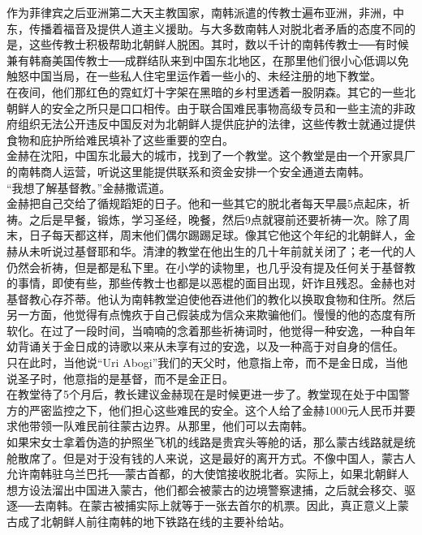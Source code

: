 作为菲律宾之后亚洲第二大天主教国家，南韩派遣的传教士遍布亚洲，非洲，中东，传播着福音及提供人道主义援助。与大多数南韩人对脱北者矛盾的态度不同的是，这些传教士积极帮助北朝鲜人脱困。其时，数以千计的南韩传教士──有时候兼有韩裔美国传教士──成群结队来到中国东北地区，在那里他们很小心低调以免触怒中国当局，在一些私人住宅里运作着一些小的、未经注册的地下教堂。\\

在夜间，他们那红色的霓虹灯十字架在黑暗的乡村里透着一股阴森。其它的一些北朝鲜人的安全之所只是口口相传。由于联合国难民事物高级专员和一些主流的非政府组织无法公开违反中国反对为北朝鲜人提供庇护的法律，这些传教士就通过提供食物和庇护所给难民填补了这些重要的空白。\\

金赫在沈阳，中国东北最大的城市，找到了一个教堂。这个教堂是由一个开家具厂的南韩商人运营，听说这里能提供联系和资金安排一个安全通道去南韩。\\

“我想了解基督教。”金赫撒谎道。\\

金赫把自己交给了循规蹈矩的日子。他和一些其它的脱北者每天早晨5点起床，祈祷。之后是早餐，锻炼，学习圣经，晚餐，然后9点就寝前还要祈祷一次。除了周末，日子每天都这样，周末他们偶尔踢踢足球。像其它他这个年纪的北朝鲜人，金赫从未听说过基督耶和华。清津的教堂在他出生的几十年前就关闭了；老一代的人仍然会祈祷，但是都是私下里。在小学的读物里，也几乎没有提及任何关于基督教的事情，即使有些，那些传教士也都是以恶棍的面目出现，奸诈且残忍。金赫也对基督教心存芥蒂。他认为南韩教堂迫使他吞进他们的教化以换取食物和住所。然后另一方面，他觉得有点愧疚于自己假装成为信众来欺骗他们。慢慢的他的态度有所软化。在过了一段时间，当喃喃的念着那些祈祷词时，他觉得一种安逸，一种自年幼背诵关于金日成的诗歌以来从未享有过的安逸，以及一种高于对自身的信任。\\

只在此时，当他说“Uri Abogi”我们的天父时，他意指上帝，而不是金日成，当他说圣子时，他意指的是基督，而不是金正日。\\

在教堂待了5个月后，教长建议金赫现在是时候更进一步了。教堂现在处于中国警方的严密监控之下，他们担心这些难民的安全。这个人给了金赫1000元人民币并要求他带领一队难民前往蒙古边界。从那里，他们可以去南韩。\\

如果宋女士拿着伪造的护照坐飞机的线路是贵宾头等舱的话，那么蒙古线路就是统舱散席了。但是对于没有钱的人来说，这是最好的离开方式。不像中国人，蒙古人允许南韩驻乌兰巴托──蒙古首都，的大使馆接收脱北者。实际上，如果北朝鲜人想方设法溜出中国进入蒙古，他们都会被蒙古的边境警察逮捕，之后就会移交、驱逐──去南韩。在蒙古被捕实际上就等于一张去首尔的机票。因此，真正意义上蒙古成了北朝鲜人前往南韩的地下铁路在线的主要补给站。\\

